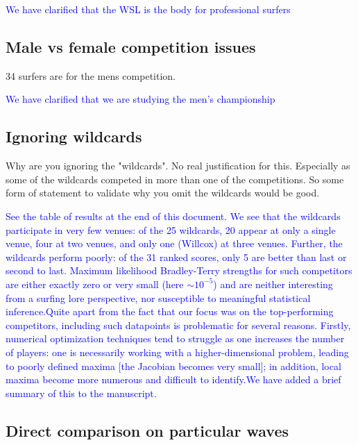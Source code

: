 \documentclass[12pt]{article}
\begin{document}
\textcolor{blue}{We have clarified that the WSL is the body for professional surfers}



\subsection*{Male vs female competition issues}

34 surfers are for the mens competition.

\textcolor{blue}{We have clarified that we are studying the men's
  championship}



\subsection*{Ignoring wildcards}

Why are you ignoring the "wildcards". No real justification for
this. Especially as some of the wildcards competed in more than one of
the competitions. So some form of statement to validate why you omit
the wildcards would be good.

\textcolor{blue}{See the table of results at the end of this document.
  We see that the wildcards participate in very few venues: of the 25
  wildcards, 20 appear at only a single venue, four at two venues, and
  only one (Willcox) at three venues.  Further, the wildcards perform
  poorly: of the 31 ranked scores, only 5 are better than last or
  second to last.  Maximum likelihood Bradley-Terry strengths for such
  competitors are either exactly zero or very small (here $\sim
  10^{-5}$) and are neither interesting from a surfing lore
  perspective, nor susceptible to meaningful statistical
  inference.\newline Quite apart from the fact that our focus was on
  the top-performing competitors, including such datapoints is
  problematic for several reasons.  Firstly, numerical optimization
  techniques tend to struggle as one increases the number of players:
  one is necessarily working with a higher-dimensional problem,
  leading to poorly defined maxima [the Jacobian becomes very small];
  in addition, local maxima become more numerous and difficult to
  identify.\newline We have added a brief summary of this to the
  manuscript.}

\subsection*{Direct comparison on particular waves}
\end{document}
